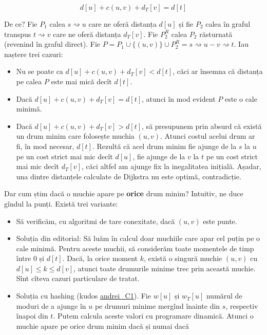 \documentclass[../main.tex]{subfiles}
\begin{document}
$$d[u] + c(u,v) + d_T[v] = d[t]$$

De ce? Fie $P_1$ calea $s \rightsquigarrow u$ care ne oferă distanța $d[u]$ și fie $P_2$ calea în graful transpus $t \rightsquigarrow v$ care ne oferă distanța $d_T[v]$. Fie $P_2^R$ calea $P_2$ răsturnată (revenind în graful direct). Fie $P = P_1 \cup \{(u,v)\} \cup P_2^R = s \rightsquigarrow u - v \rightsquigarrow t$. Iau naștere trei cazuri:

\begin{itemize}
  \item Nu se poate ca $d[u] + c(u,v) + d_T[v] < d[t]$, căci ar însemna că distanța pe calea $P$ este mai mică decît $d[t]$.

  \item Dacă $d[u] + c(u,v) + d_T[v] = d[t]$, atunci în mod evident $P$ este o cale minimă.

  \item Dacă $d[u] + c(u,v) + d_T[v] > d[t]$, să presupunem prin absurd că există un drum minim care folosește muchia $(u,v)$. Atunci costul acelui drum ar fi, în mod necesar, $d[t]$. Rezultă că acel drum minim fie ajunge de la $s$ la $u$ pe un cost strict mai mic decît $d[u]$, fie ajunge de la $v$ la $t$ pe un cost strict mai mic decît $d_T[v]$, căci altfel am ajunge fix la inegalitatea inițială. Așadar, una dintre distanțele calculate de Dijkstra nu este optimă, contradicție.
\end{itemize}

Dar cum știm dacă o muchie apare pe \textbf{orice} drum minim? Intuitiv, ne duce gîndul la punți. Există trei variante:

\begin{itemize}
  \item Să verificăm, cu algoritmi de tare conexitate, dacă $(u,v)$ este punte.

  \item Soluția din editorial: Să luăm în calcul doar muchiile care apar cel puțin pe o cale minimă. Pentru aceste muchii, să considerăm toate momentele de timp între 0 și $d[t]$. Dacă, la orice moment $k$, există o singură muchie $(u,v)$ cu $d[u] \leq k \leq d[v]$, atunci toate drumurile minime trec prin această muchie. Sînt cîteva cazuri particulare de tratat.

  \item Soluția cu hashing (kudos \href{https://codeforces.com/contest/567/submission/240455412}{andrei\_C1}). Fie $w[u]$ și $w_T[u]$ numărul de moduri de a ajunge în $u$ pe drumuri minime mergînd înainte din $s$, respectiv înapoi din $t$. Putem calcula aceste valori cu programare dinamică. Atunci o muchie apare pe orice drum minim dacă și numai dacă
\end{itemize}
\end{document}
